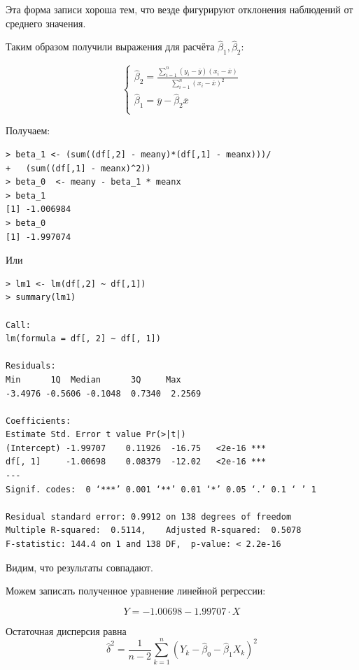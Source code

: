 \documentclass[14pt,a4paper]{scrartcl}
\begin{document}
Эта форма записи хороша тем, что везде фигурируют отклонения наблюдений от среднего значения.


Таким образом получили выражения для расчёта $\hat \beta_1,\hat \beta_2$:

\begin{equation}\label{20}
	\begin{cases} 
	 \hat\beta_2 = \frac{\sum\limits_{i=1}^{n}(y_i-\overline{y})(x_i-\overline{x})}{\sum\limits_{i=1}^{n}(x_i-\overline{x})^2}\\
	 \hat\beta_1 = \overline{y} - \hat\beta_2\overline{x}\\ 
	\end{cases}	
\end{equation}

Получаем:
\begin{verbatim}
> beta_1 <- (sum((df[,2] - meany)*(df[,1] - meanx)))/
+   (sum((df[,1] - meanx)^2))
> beta_0  <- meany - beta_1 * meanx
> beta_1
[1] -1.006984
> beta_0
[1] -1.997074
\end{verbatim}

Или
\begin{verbatim}
> lm1 <- lm(df[,2] ~ df[,1])
> summary(lm1)

Call:
lm(formula = df[, 2] ~ df[, 1])

Residuals:
Min      1Q  Median      3Q     Max 
-3.4976 -0.5606 -0.1048  0.7340  2.2569 

Coefficients:
Estimate Std. Error t value Pr(>|t|)    
(Intercept) -1.99707    0.11926  -16.75   <2e-16 ***
df[, 1]     -1.00698    0.08379  -12.02   <2e-16 ***
---
Signif. codes:  0 ‘***’ 0.001 ‘**’ 0.01 ‘*’ 0.05 ‘.’ 0.1 ‘ ’ 1

Residual standard error: 0.9912 on 138 degrees of freedom
Multiple R-squared:  0.5114,	Adjusted R-squared:  0.5078 
F-statistic: 144.4 on 1 and 138 DF,  p-value: < 2.2e-16
\end{verbatim}

Видим, что результаты совпадают.

Можем записать полученное уравнение линейной регрессии:

\begin{equation*}
	Y = -1.00698 -1.99707\cdot X
\end{equation*}


Остаточная дисперсия равна
\begin{equation*}
	\hat{\delta}^{2}=\frac{1}{n-2} \sum_{k=1}^{n}\left(Y_{k}-\hat{\beta}_{0}-\hat{\beta}_{1} X_{k}\right)^{2}
\end{equation*}
\end{document}
